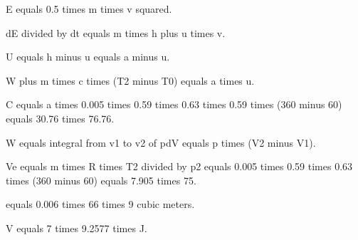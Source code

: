 E equals 0.5 times m times v squared. 

dE divided by dt equals m times h plus u times v. 

U equals h minus u equals a minus u. 

W plus m times c times (T2 minus T0) equals a times u. 

C equals a times 0.005 times 0.59 times 0.63 times 0.59 times (360 minus 60) equals 30.76 times 76.76. 

W equals integral from v1 to v2 of pdV equals p times (V2 minus V1). 

Ve equals m times R times T2 divided by p2 equals 0.005 times 0.59 times 0.63 times (360 minus 60) equals 7.905 times 75. 

equals 0.006 times 66 times 9 cubic meters. 

V equals 7 times 9.2577 times J.